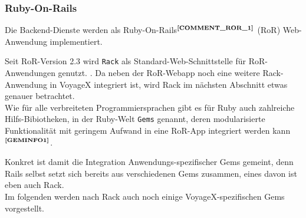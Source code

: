 \subsubsection{Ruby-On-Rails}
Die Backend-Dienste werden als Ruby-On-Rails$^{\textbf{\ref{COMMENT_ROR_1}}}$ (RoR) Web-Anwendung implementiert.%
\addtocounter{footnote}{1}
%
Seit RoR-Version 2.3 wird \texttt{Rack} als Standard-Web-Schnittstelle für RoR-Anwendungen genutzt. \cite{WIKI:RACK_SINCE_2.3}. Da neben der RoR-Webapp noch eine weitere Rack-Anwendung in VoyageX integriert ist, wird Rack im nächsten Abschnitt etwas genauer betrachtet.\\
Wie für alle verbreiteten Programmiersprachen gibt es für Ruby auch zahlreiche Hilfs-Bibiotheken, in der Ruby-Welt \texttt{Gems} genannt, deren modularisierte Funktionalität mit geringem Aufwand in eine RoR-App integriert werden kann $^{\textbf{\ref{GEMINFO1}}}$.%
\addtocounter{footnote}{1}%
Konkret ist damit die Integration Anwendungs-spezifischer Gems gemeint, denn Rails selbst setzt sich bereits aus verschiedenen Gems zusammen, eines davon ist eben auch Rack.\\
Im folgenden werden nach Rack auch noch einige VoyageX-spezifischen Gems vorgestellt.

